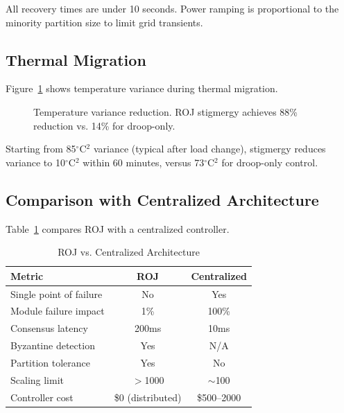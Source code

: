 \documentclass[conference,10pt]{IEEEtran}
\begin{document}
All recovery times are under 10 seconds. Power ramping is proportional to the minority partition size to limit grid transients.

\subsection{Thermal Migration}

Figure~\ref{fig:thermal} shows temperature variance during thermal migration.

\begin{figure}[htbp]
\centering
{}
\caption{Temperature variance reduction. ROJ stigmergy achieves 88\% reduction vs. 14\% for droop-only.}
\label{fig:thermal}
\end{figure}

Starting from 85$^\circ$C$^2$ variance (typical after load change), stigmergy reduces variance to 10$^\circ$C$^2$ within 60 minutes, versus 73$^\circ$C$^2$ for droop-only control.

\subsection{Comparison with Centralized Architecture}

Table~\ref{tab:centralized} compares ROJ with a centralized controller.

\begin{table}[htbp]
\caption{ROJ vs. Centralized Architecture}
\label{tab:centralized}
\centering
\begin{tabular}{@{}lcc@{}}
\toprule
\textbf{Metric} & \textbf{ROJ} & \textbf{Centralized} \\
\midrule
Single point of failure & No & Yes \\
Module failure impact & 1\% & 100\% \\
Consensus latency & 200ms & 10ms \\
Byzantine detection & Yes & N/A \\
Partition tolerance & Yes & No \\
Scaling limit & $>$1000 & $\sim$100 \\
Controller cost & \$0 (distributed) & \$500--2000 \\
\bottomrule
\end{tabular}
\end{table}
\end{document}
